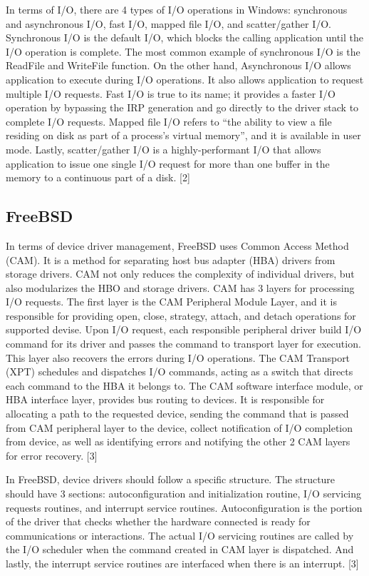 \documentclass[10pt,a4paper]{article}
\begin{document}
In terms of I/O, there are 4 types of I/O operations in Windows: synchronous and asynchronous I/O, fast I/O, mapped file I/O, and scatter/gather I/O. Synchronous I/O is the default I/O, which blocks the calling application until the I/O operation is complete. The most common example of synchronous I/O is the ReadFile and WriteFile function. On the other hand, Asynchronous I/O allows application to execute during I/O operations. It also allows application to request multiple I/O requests. Fast I/O is true to its name; it provides a faster I/O operation by bypassing the IRP generation and go directly to the driver stack to complete I/O requests. Mapped file I/O refers to “the ability to view a file residing on disk as part of a process’s virtual memory”, and it is available in user mode. Lastly, scatter/gather I/O is a highly-performant I/O that allows application to issue one single I/O request for more than one buffer in the memory to a continuous part of a disk. [2]

\subsection{FreeBSD}
In terms of device driver management, FreeBSD uses Common Access Method (CAM). It is a method for separating host bus adapter (HBA) drivers from storage drivers. CAM not only reduces the complexity of individual drivers, but also modularizes the HBO and storage drivers. CAM has 3 layers for processing I/O requests. The first layer is the CAM Peripheral Module Layer, and it is responsible for providing open, close, strategy, attach, and detach operations for supported devise. Upon I/O request, each responsible peripheral driver build I/O command for its driver and passes the command to transport layer for execution. This layer also recovers the errors during I/O operations. The CAM Transport (XPT) schedules and dispatches I/O commands, acting as a switch that directs each command to the HBA it belongs to. The CAM software interface module, or HBA interface layer, provides bus routing to devices. It is responsible for allocating a path to the requested device, sending the command that is passed from CAM peripheral layer to the device, collect notification of I/O completion from device, as well as identifying errors and notifying the other 2 CAM layers for error recovery. [3]

In FreeBSD, device drivers should follow a specific structure. The structure should have 3 sections: autoconfiguration and initialization routine, I/O servicing requests routines, and interrupt service routines. Autoconfiguration is the portion of the driver that checks whether the hardware connected is ready for communications or interactions. The actual I/O servicing routines are called by the I/O scheduler when the command created in CAM layer is dispatched. And lastly, the interrupt service routines are interfaced when there is an interrupt. [3]
\end{document}
